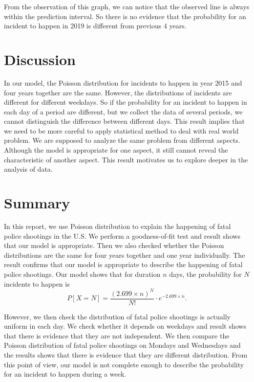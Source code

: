 \documentclass[11pt,a4paper,english]{article}
\begin{document}
From the observation of this graph, we can notice that the observed line is always within the prediction interval. So there is no evidence that the probability for an incident to happen in 2019 is different from previous 4 years.

\section{Discussion}
In our model, the Poisson distribution for incidents to happen in year 2015 and four years together are the same. However, the distributions of incidents are different for different weekdays. So if the probability for an incident to happen in each day of a period are different, but we collect the data of several periods, we cannot distinguish the difference between different days. This result implies that we need to be more careful to apply statistical method to deal with real world problem. We are supposed to analyze the same problem from different aspects. Although the model is appropriate for one aspect, it still cannot reveal the characteristic of another aspect. This result motivates us to explore deeper in the analysis of data.

\section{Summary}
In this report, we use Poisson distribution to explain the happening of fatal police shootings in the U.S. We perform a goodness-of-fit test and result shows that our model is appropriate. Then we also checked whether the Poisson distributions are the same for four years together and one year individually. The result confirms that our model is appropriate to describe the happening of fatal police shootings. Our model shows that for duration $n$ days, the probability for $N$ incidents to happen is 
\begin{equation*}
	P[X = N] = \frac{(2.699 \times n)^{N}}{N!}\cdot e^{-2.699 \times n}.
\end{equation*}

However, we then check the distribution of fatal police shootings is actually uniform in each day. We check whether it depends on weekdays and result shows that there is evidence that they are not independent. We then compare the Poisson distribution of fatal police shootings on Mondays and Wednesdays and the results shows that there is evidence that they are different distribution. From this point of view, our model is not complete enough to describe the probability for an incident to happen during a week.
\end{document}
